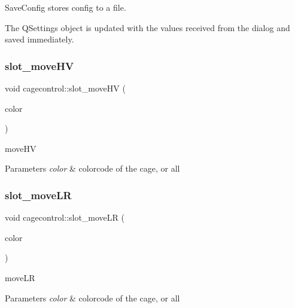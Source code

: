 Save\+Config stores config to a file. 

The Q\+Settings object is updated with the values received from the dialog and saved immediately. \mbox{\label{classcagecontrol_af9a2772a38394159c54d7e5d7f2a86fb}} 
\subsubsection{\texorpdfstring{slot\+\_\+move\+HV}{slot\_moveHV}}
{\footnotesize\ttfamily void cagecontrol\+::slot\+\_\+move\+HV (\begin{DoxyParamCaption}\item[{Q\+String}]{color }\end{DoxyParamCaption})\hspace{0.3cm}{\ttfamily [slot]}}



move\+HV 


\begin{DoxyParams}{Parameters}
{\em color} & colorcode of the cage, or \textquotesingle{}all\textquotesingle{} \\
\hline
\end{DoxyParams}
\mbox{\label{classcagecontrol_a138905383fdc09a0b5077a185eaf6682}} 
\subsubsection{\texorpdfstring{slot\+\_\+move\+LR}{slot\_moveLR}}
{\footnotesize\ttfamily void cagecontrol\+::slot\+\_\+move\+LR (\begin{DoxyParamCaption}\item[{Q\+String}]{color }\end{DoxyParamCaption})\hspace{0.3cm}{\ttfamily [slot]}}



move\+LR 


\begin{DoxyParams}{Parameters}
{\em color} & colorcode of the cage, or \textquotesingle{}all\textquotesingle{} \\
\hline
\end{DoxyParams}
\mbox{\label{classcagecontrol_a2d971435af3267351272b2c2d5f2f709}} 
